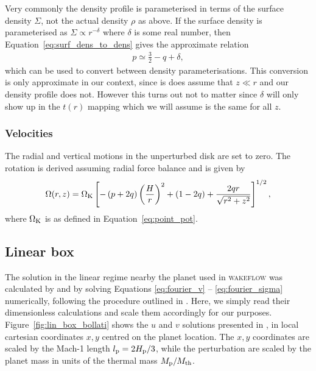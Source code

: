 Very commonly the density profile is parameterised in terms of the surface density $\Sigma$, not the actual density $\rho$ as above.
If the surface density is parameterised as $\Sigma \propto r^{-\delta}$ where $\delta$ is some real number, then Equation~\eqref{eq:surf_dens_to_dens} gives the approximate relation 
\begin{align}
    p \simeq \frac{3}{2} - q + \delta,
\end{align}
which can be used to convert between density parameterisations.
This conversion is only approximate in our context, since is does assume that $z \ll r$ and our density profile does not.
However this turns out not to matter since $\delta$ will only show up in the $t(r)$ mapping which we will assume is the same for all $z$.

\subsubsection{Velocities}

The radial and vertical motions in the unperturbed disk are set to zero. 
The rotation is derived assuming radial force balance \citep[e.g.][]{nelson2013} and is given by 
\begin{align}
    \Omega(r,z) = \Omega_{\rm K} \left[ - \left(p + 2q\right) \left( \frac{H}{r} \right)^2 + \left( 1-2q \right) + \frac{2qr}{\sqrt{r^2 + z^2}}\right]^{1/2}, \label{eq:omega_wf_ps}
\end{align}
where $\Omega_{\rm K}$ is as defined in Equation~\eqref{eq:point_pot}.

\subsection{Linear box} \label{sec:linear_box}

The solution in the linear regime nearby the planet used in \textsc{wakeflow} was calculated by \citet{bollati2020} and \citet{bollati2021} by solving Equations \eqref{eq:fourier_v} -- \eqref{eq:fourier_sigma} numerically, following the procedure outlined in \citet{goodman2001}.
Here, we simply read their dimensionless calculations and scale them accordingly for our purposes. Figure~\ref{fig:lin_box_bollati} shows the $u$ and $v$ solutions presented in \citet{bollati2021}, in local cartesian coordinates $x,y$ centred on the planet location.
The $x,y$ coordinates are scaled by the Mach-1 length $l_{\rm p} = 2H_{\rm p}/3$, while the perturbation are scaled by the planet mass in units of the thermal mass $M_{\rm p} / M_{\rm th}$.

